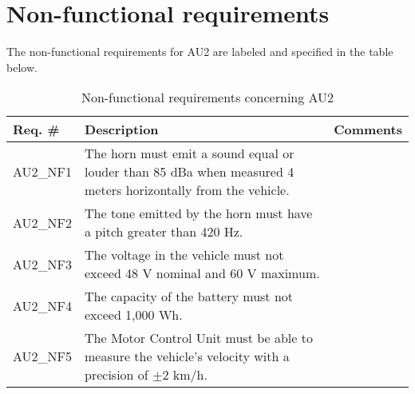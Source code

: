 \section{Non-functional requirements}
The non-functional requirements for AU2 are labeled and specified in the table below.

\begin{table}[h!]
	\centering
	\label{my-label}
	\begin{tabular}{|p{2 cm}|p{7 cm}|p{4 cm}|}
		\hline
		\textbf{Req. \#} & \textbf{Description} & \textbf{Comments} \\\hline
		AU2\_NF1	& The horn must emit a sound equal or louder than 85 dBa when measured 4 meters horizontally from the vehicle. &	\\\hline
		AU2\_NF2	& The tone emitted by the horn must have a pitch greater than 420 Hz. &	\\\hline
		AU2\_NF3	& The voltage in the vehicle must not exceed 48 V nominal and 60 V maximum. &	\\\hline
		AU2\_NF4	& The capacity of the battery must not exceed 1,000 Wh. &	\\\hline
		AU2\_NF5	& The Motor Control Unit must be able to measure the vehicle's velocity with a precision of $\pm$2 km/h. &	\\\hline
	\end{tabular}
	\caption{Non-functional requirements concerning AU2}
\end{table}
